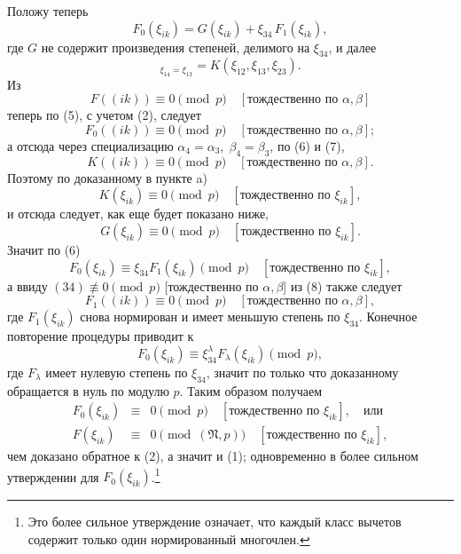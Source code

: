 \documentclass[11pt]{article}
\providecommand{\frN}{\mathfrak N}
\begin{document}
Положу теперь
\begin{equation}
        F_0(\xi_{ik})=G(\xi_{ik})+\xi_{34}\,F_1(\xi_{ik}),
\end{equation}
где \(G\) не содержит произведения степеней, делимого на \(\xi_{34}\), и далее
\begin{equation}
        [G]_{\xi_{14}=\xi_{13}}=K(\xi_{12},\xi_{13},\xi_{23}).
\end{equation}
Из
\[
        F((ik))\equiv0\pmod p\quad[\text{тождественно по \(\alpha,\beta\)}]
\]
теперь по (5), с учетом (2), следует
\begin{equation}
        F_0((ik))\equiv0\pmod p\quad [\text{тождественно по \(\alpha,\beta\)}];
\end{equation}
а отсюда через специализацию \(\alpha_4=\alpha_3,\;\beta_4=\beta_3\), по (6) и (7),
\[
        K((ik))\equiv0\pmod p\quad [\text{тождественно по \(\alpha,\beta\)}].
\]
Поэтому по доказанному в пункте a)
\[
        K(\xi_{ik})\equiv0\pmod p\quad [\text{тождественно по \(\xi_{ik}\)}],
\]
и отсюда следует, как еще будет показано ниже,
\[
        G(\xi_{ik})\equiv0\pmod p\quad [\text{тождественно по \(\xi_{ik}\)}].
\]
Значит по (6)
\[
        F_0(\xi_{ik})\equiv\xi_{34}F_1(\xi_{ik})\pmod p\quad [\text{тождественно по \(\xi_{ik}\)}],
\]
а ввиду \((34)\not\equiv0\pmod p\) [тождественно по \(\alpha,\beta\)] из (8) также следует
\[
        F_1((ik))\equiv0\pmod p\quad [\text{тождественно по \(\alpha,\beta\)}],
\]
где \(F_1(\xi_{ik})\) снова нормирован и имеет меньшую степень по \(\xi_{34}\). Конечное повторение процедуры приводит к
\[
        F_0(\xi_{ik})\equiv\xi_{34}^{\lambda}F_\lambda(\xi_{ik})\pmod p,
\]
где \(F_\lambda\) имеет нулевую степень по \(\xi_{34}\), значит по только что доказанному обращается в нуль по модулю \(p\). Таким образом получаем
\begin{equation}
\begin{array}{rcl}
        F_0(\xi_{ik})&\equiv&0\pmod p\quad [\text{тождественно по \(\xi_{ik}\)}],\quad\text{или}\\
        F(\xi_{ik})&\equiv&0\pmod{(\frN,p)}\quad [\text{тождественно по \(\xi_{ik}\)}],
\end{array}
\end{equation}
чем доказано обратное к (2), а значит и (1); одновременно в более сильном утверждении для \(F_0(\xi_{ik})\).\footnote{Это более сильное утверждение означает, что каждый класс вычетов содержит только один нормированный многочлен.}
\end{document}

